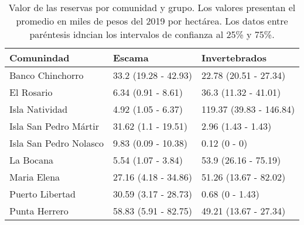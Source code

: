 \begin{table}

\caption{\label{tab:tot_val}Valor de las reservas por comunidad y grupo. Los valores presentan el promedio en miles de pesos del 2019 por hectárea. Los datos entre paréntesis idncian los intervalos de confianza al 25\% y 75\%.}
\centering
\begin{tabular}[t]{lll}
\toprule
Comunindad & Escama & Invertebrados\\
\midrule
Banco Chinchorro & 33.2 (19.28 - 42.93) & 22.78 (20.51 - 27.34)\\
El Rosario & 6.34 (0.91 - 8.61) & 36.3 (11.32 - 41.01)\\
Isla Natividad & 4.92 (1.05 - 6.37) & 119.37 (39.83 - 146.84)\\
Isla San Pedro Mártir & 31.62 (1.1 - 19.51) & 2.96 (1.43 - 1.43)\\
Isla San Pedro Nolasco & 9.83 (0.09 - 10.38) & 0.12 (0 - 0)\\
\addlinespace
La Bocana & 5.54 (1.07 - 3.84) & 53.9 (26.16 - 75.19)\\
Maria Elena & 27.16 (4.18 - 34.86) & 51.26 (13.67 - 82.02)\\
Puerto Libertad & 30.59 (3.17 - 28.73) & 0.68 (0 - 1.43)\\
Punta Herrero & 58.83 (5.91 - 82.75) & 49.21 (13.67 - 27.34)\\
\bottomrule
\end{tabular}
\end{table}